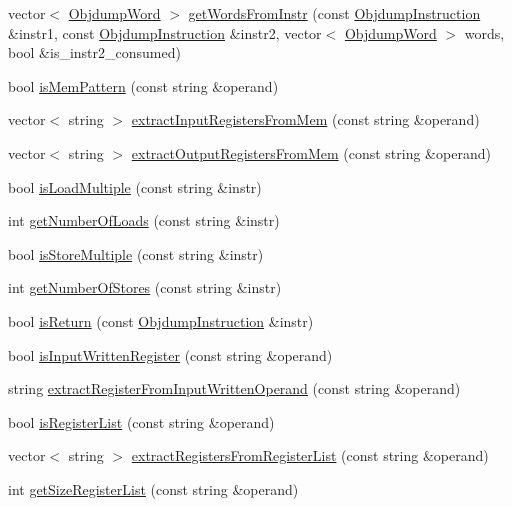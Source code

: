 \begin{DoxyCompactItemize}
\item 
vector$<$ \hyperlink{classObjdumpWord}{Objdump\+Word} $>$ \hyperlink{classARM_a550a39c74ccd7308c20d1a3259f25ca2}{get\+Words\+From\+Instr} (const \hyperlink{classObjdumpInstruction}{Objdump\+Instruction} \&instr1, const \hyperlink{classObjdumpInstruction}{Objdump\+Instruction} \&instr2, vector$<$ \hyperlink{classObjdumpWord}{Objdump\+Word} $>$ words, bool \&is\+\_\+instr2\+\_\+consumed)
\item 
bool \hyperlink{classARM_a0e3c93edce9d2f24aa69eac3accac2bb}{is\+Mem\+Pattern} (const string \&operand)
\item 
vector$<$ string $>$ \hyperlink{classARM_a9e3c7c33a89377beca2b31ebacf2793c}{extract\+Input\+Registers\+From\+Mem} (const string \&operand)
\item 
vector$<$ string $>$ \hyperlink{classARM_a4d2fbc77b15f4672ed20f06cc44e4c4e}{extract\+Output\+Registers\+From\+Mem} (const string \&operand)
\item 
bool \hyperlink{classARM_a426d805ed2f8ff041c2904b08f4f8953}{is\+Load\+Multiple} (const string \&instr)
\item 
int \hyperlink{classARM_afaa30a7fb0948c057acfc2673c4dc4c6}{get\+Number\+Of\+Loads} (const string \&instr)
\item 
bool \hyperlink{classARM_a2c8848aa0ead5e445c3f637d527fae03}{is\+Store\+Multiple} (const string \&instr)
\item 
int \hyperlink{classARM_a624c0346f9f963c9f42ae155c67e728f}{get\+Number\+Of\+Stores} (const string \&instr)
\item 
bool \hyperlink{classARM_a341bfe78c32b16cd589cc9b4775e38fe}{is\+Return} (const \hyperlink{classObjdumpInstruction}{Objdump\+Instruction} \&instr)
\item 
bool \hyperlink{classARM_a4c35c414b95295974d60a365443c1a4a}{is\+Input\+Written\+Register} (const string \&operand)
\item 
string \hyperlink{classARM_a32da27e5c024c3291b12a62ffc2b3070}{extract\+Register\+From\+Input\+Written\+Operand} (const string \&operand)
\item 
bool \hyperlink{classARM_a62f252e1f0782243bc908a080ca1b427}{is\+Register\+List} (const string \&operand)
\item 
vector$<$ string $>$ \hyperlink{classARM_abbd225e086b20313a6eb5afbb45b955a}{extract\+Registers\+From\+Register\+List} (const string \&operand)
\item 
int \hyperlink{classARM_a356b1ab7252a6f1183747378a2d66b08}{get\+Size\+Register\+List} (const string \&operand)

\end{DoxyCompactItemize}
